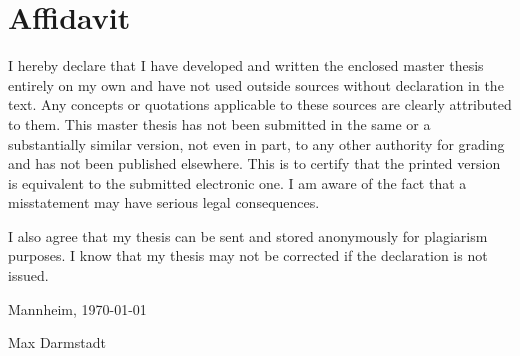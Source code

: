 \newpage

\section*{Affidavit}
{I hereby declare that I have developed and written the enclosed master thesis entirely on my own and have not used outside sources without declaration in the text. Any concepts or quotations applicable to these sources are clearly attributed to them. This master thesis has not been submitted in the same or a substantially similar version, not even in part, to any other authority for grading and has not been published elsewhere. This is to certify that the printed version is equivalent to the submitted electronic one. I am aware of the fact that a misstatement may have serious legal consequences.\par}

\vspace{0.7cm}
{I also agree that my thesis can be sent and stored anonymously for plagiarism purposes. I know that my thesis may not be corrected if the declaration is not issued.\par}
\vspace{0.7cm}


Mannheim, \today

\vspace{1.4cm}
Max Darmstadt